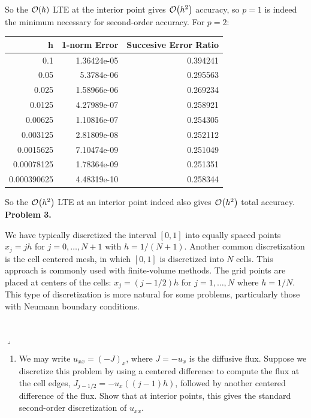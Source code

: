 \documentclass[12pt]{article}
\newenvironment{myprob}[1]
    {%
    \noindent{\Huge$\ulcorner$}\textbf{#1.}\begin{em}
    }
    { 
    \end{em} \\ \hphantom{l} \hfill {\Huge$\lrcorner$} }
\begin{document}
So the $\order{h}$ LTE at the interior point gives $\order{h^2}$ accuracy, so $p=1$ is indeed the minimum necessary for second-order accuracy.
For $p=2$: \\
\begin{center}
\begin{tabular}{rrr}
\hline
    h &   1-norm Error &   Succesive Error Ratio \\
\hline
 0.1         &                   1.36424e-05 &                0.394241 \\
 0.05        &                   5.3784e-06  &                0.295563 \\
 0.025       &                   1.58966e-06 &                0.269234 \\
 0.0125      &                   4.27989e-07 &                0.258921 \\
 0.00625     &                   1.10816e-07 &                0.254305 \\
 0.003125    &                   2.81809e-08 &                0.252112 \\
 0.0015625   &                   7.10474e-09 &                0.251049 \\
 0.00078125  &                   1.78364e-09 &                0.251351 \\
 0.000390625 &                   4.48319e-10 &                0.258344 \\
\hline
\end{tabular}
\end{center}
So the $\order{h^2}$ LTE at an interior point indeed also gives $\order{h^2}$ total accuracy. \\

\begin{myprob}{Problem 3}
We have typically discretized the interval $[0,1]$ into equally spaced points $x_j = jh$ for $j=0, \dots, N+1$ with $h=1/(N+1)$.  Another common discretization is the cell centered mesh, in which $[0,1]$ is discretized into $N$ cells. This approach is commonly used with finite-volume methods.  The grid points are placed at centers of the cells: $x_j = (j-1/2)h$ for $j=1, \dots , N$ where $h=1/N$.  This type of discretization is more natural for some problems, particularly those with Neumann boundary conditions.
\end{myprob}
\begin{enumerate}[ \ \ (a)]
\item We may write $u_{xx} = (-J)_x$, where $J=-u_x$ is the diffusive flux.  Suppose we discretize this problem by using a centered difference to compute the flux at the cell edges, $J_{j-1/2} = -u_x((j-1)h)$, followed by another centered difference of the flux.  Show that at interior points, this gives the standard second-order discretization of $u_{xx}$.  
\end{enumerate}
\end{document}
